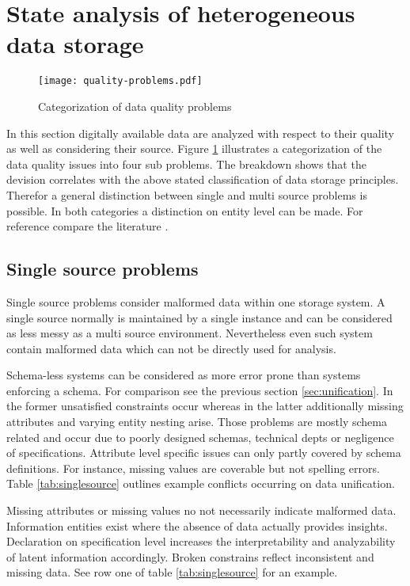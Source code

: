 \section{State analysis of heterogeneous data storage\label{sec:stateanalysis}}

\begin{figure}[htb]
  \centering
  \texttt{[image: quality-problems.pdf]}\\
  \caption{Categorization of data quality problems}\label{fig:qualityproblems}
\end{figure}

In this section digitally available data are analyzed with respect to their quality as well as considering their source. Figure \ref{fig:qualityproblems} illustrates a categorization of the data quality issues into four sub problems. The breakdown shows that the devision correlates with the above stated classification of data storage principles. Therefor a general distinction between single and multi source problems is possible. In both categories a distinction on entity level can be made. For reference compare the literature
.

\subsection{Single source problems}

Single source problems consider malformed data within one storage system. A single source normally is maintained by a single instance and can be considered as less messy as a multi source environment. Nevertheless even such system contain malformed data which can not be directly used for analysis.

Schema-less systems can be considered as more error prone than systems enforcing a schema. For comparison see the previous section \ref{sec:unification}. In the former unsatisfied constraints occur whereas in the latter additionally missing attributes and varying entity nesting arise. Those problems are mostly schema related and occur due to poorly designed schemas, technical depts or negligence of specifications. Attribute level specific issues can only partly covered by schema definitions. For instance, missing values are coverable but not spelling errors. Table \ref{tab:singlesource} outlines example conflicts occurring on data unification. 

Missing attributes or missing values no not necessarily indicate malformed data. Information entities exist where the absence of data actually provides insights. Declaration on specification level increases the interpretability and analyzability of latent information accordingly. Broken constrains reflect inconsistent and missing data. See row one of table \ref{tab:singlesource} for an example.

